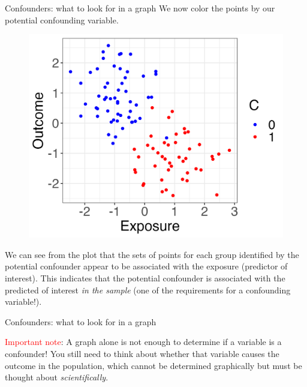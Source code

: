 \documentclass[10pt,t]{beamer}
\begin{document}
\begin{frame}{Confounders: what to look for in a graph}
We now color the points by our potential confounding variable.
\vspace{0.3cm}

\begin{figure}
	\centering \includegraphics[scale=0.4]{p1.png}
\end{figure}

\vspace{0.3cm} \pause
\small We can see from the plot that the sets of points for each group identified by the potential confounder appear to be associated with the exposure (predictor of interest). This indicates that the potential confounder is associated with the predicted of interest \textit{in the sample} (one of the requirements for a confounding variable!).

\end{frame}

\begin{frame}{Confounders: what to look for in a graph}

\textcolor{red}{Important note}: A graph alone is not enough to determine if a variable is a confounder! You still need to think about whether that variable causes the outcome in the population, which cannot be determined graphically but must be thought about \textit{scientifically}.

\end{frame}
\end{document}
